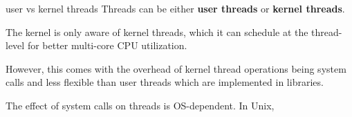 \begin{defn}{user vs kernel threads}
    Threads can be either \textbf{user threads} or \textbf{kernel threads}.
    
    The kernel is only aware of kernel threads, which it can schedule at the thread-level for better multi-core CPU utilization.

    However, this comes with the overhead of kernel thread operations being system calls and less flexible than user threads which are implemented in libraries.
\end{defn}

The effect of system calls on threads is OS-dependent. In Unix,
\begin{itemize*}
\end{itemize*}

